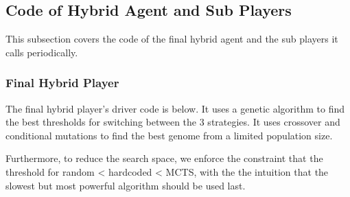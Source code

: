 \subsection{Code of Hybrid Agent and Sub Players}

This subsection covers the code of the final hybrid agent and the sub players it calls periodically.

\subsubsection{Final Hybrid Player}

The final hybrid player's driver code is below. It uses a genetic algorithm to find the best thresholds for switching between the 3 strategies. It uses crossover and conditional mutations to find the best genome from a limited population size.

Furthermore, to reduce the search space, we enforce the constraint that the threshold for random < hardcoded < MCTS, with the the intuition that the slowest but most powerful algorithm should be used last.

